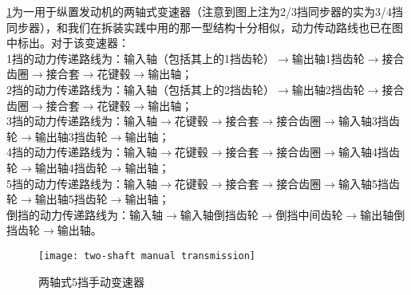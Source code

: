 \documentclass[UTF8]{ctexart}
\numberwithin{figure}{section}
\numberwithin{table}{section}
\begin{document}
\cref{two-shaft manual transmission}为一用于纵置发动机的两轴式变速器（注意到图上注为2/3挡同步器的实为3/4挡同步器），和我们在拆装实践中用的那一型结构十分相似，动力传动路线也已在图中标出。对于该变速器：\\
1挡的动力传递路线为：输入轴（包括其上的1挡齿轮）$\rightarrow$输出轴1挡齿轮$\rightarrow$接合齿圈$\rightarrow$接合套$\rightarrow$花键毂$\rightarrow$输出轴；\\
2挡的动力传递路线为：输入轴（包括其上的2挡齿轮）$\rightarrow$输出轴2挡齿轮$\rightarrow$接合齿圈$\rightarrow$接合套$\rightarrow$花键毂$\rightarrow$输出轴；\\
3挡的动力传递路线为：输入轴$\rightarrow$花键毂$\rightarrow$接合套$\rightarrow$接合齿圈$\rightarrow$输入轴3挡齿轮$\rightarrow$输出轴3挡齿轮$\rightarrow$输出轴；\\
4挡的动力传递路线为：输入轴$\rightarrow$花键毂$\rightarrow$接合套$\rightarrow$接合齿圈$\rightarrow$输入轴4挡齿轮$\rightarrow$输出轴4挡齿轮$\rightarrow$输出轴；\\
5挡的动力传递路线为：输入轴$\rightarrow$花键毂$\rightarrow$接合套$\rightarrow$接合齿圈$\rightarrow$输入轴5挡齿轮$\rightarrow$输出轴5挡齿轮$\rightarrow$输出轴；\\
倒挡的动力传递路线为：输入轴$\rightarrow$输入轴倒挡齿轮$\rightarrow$倒挡中间齿轮$\rightarrow$输出轴倒挡齿轮$\rightarrow$输出轴。

\begin{figure}[htbp]
	\centering
	\begin{minipage}[b]{\textwidth}
		\centering
		\texttt{[image: two-shaft manual transmission]}
		\caption{两轴式5挡手动变速器}
		\label{two-shaft manual transmission}
	\end{minipage}
\end{figure}
\end{document}
